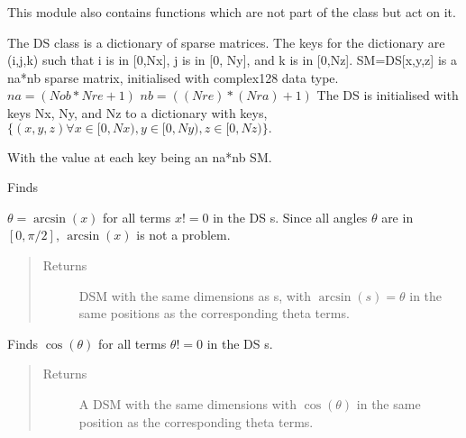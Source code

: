 \documentclass[letterpaper,10pt,english]{sphinxmanual}
\begin{document}
This module also contains functions which are not part of the class  but act on it.

\begin{fulllineitems}
\label{\detokenize{index:DictionarySparseMatrix.DS}}
The DS class is a dictionary of sparse matrices.
The keys for the dictionary are (i,j,k) such that i is in {[}0,Nx{]},
j is in {[}0, Ny{]}, and k is in {[}0,Nz{]}.
SM=DS{[}x,y,z{]} is a na*nb sparse matrix, initialised with complex128 data type.
\(na=(Nob*Nre+1)\)
\(nb=((Nre)*(Nra)+1)\)
The DS is initialised with keys Nx, Ny, and Nz to a dictionary with   keys,
\(\{ (x,y,z) \forall x \in [0,Nx), y \in [0,Ny), z \in [0,Nz)\}.\)

With the value at each key being an na*nb SM.

\begin{fulllineitems}
\label{\detokenize{index:DictionarySparseMatrix.DS.asin}}
Finds

\(\theta=\arcsin(x)\) for all terms \(x != 0\) in     the DS s. Since all angles     \(\theta\) are in \([0,\pi /2]\),     \(\arcsin(x)\) is not a problem.
\begin{quote}\begin{description}
\item[{Returns}] \leavevmode
DSM with the same dimensions as s, with     \(\arcsin(s)=\theta\) in      the same positions as the corresponding theta terms.

\end{description}\end{quote}

\end{fulllineitems}


\begin{fulllineitems}
\label{\detokenize{index:DictionarySparseMatrix.DS.cos}}
Finds \(\cos(\theta)\) for all terms     \(\theta != 0\) in the DS s.
\begin{quote}\begin{description}
\item[{Returns}] \leavevmode
A DSM with the same dimensions with     \(\cos(\theta)\) in the      same position as the corresponding theta terms.


\end{description}
\end{quote}
\end{fulllineitems}
\end{fulllineitems}
\end{document}

